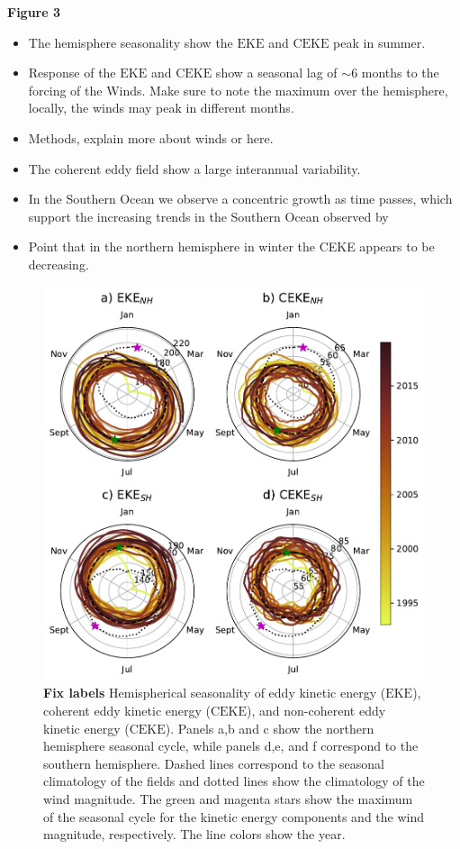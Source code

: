 \documentclass[draft,linenumbers]{agujournal2019}
\newcommand{\EKE}{\textrm{EKE}}
\newcommand{\CEKE}{\textrm{CEKE}}
\begin{document}
	\textbf{Figure 3}
	\begin{itemize}
		\item The hemisphere seasonality show the  $\EKE$ and $\CEKE$ peak in summer.
		\item Response of the $\EKE$ and $\CEKE$ show a seasonal lag of $\sim$6 months to the forcing of the Winds. Make sure to note the maximum over the hemisphere, locally, the winds may peak in different months. 
		\item Methods, explain more about winds or here. 
		\item The coherent eddy field show a large interannual variability.
		\item In the Southern Ocean we observe a concentric growth as time passes, which support the increasing trends in the Southern Ocean observed by \citep{Hogg_Recent_2015,Martinez_Kinetic_2019,Martinez_Kinetic_2021}
		\item Point that in the northern hemisphere in winter the CEKE appears to be decreasing.
	\end{itemize}

	\begin{figure}
	    \centering
	    \includegraphics[width=1\textwidth]{figures/All_polar_plots.pdf}
	    \caption{\textbf{Fix labels} Hemispherical seasonality of eddy kinetic energy ($\EKE$), coherent eddy kinetic energy ($\CEKE$), and non-coherent eddy kinetic energy ($\CEKE$). Panels a,b and c show the northern hemisphere seasonal cycle, while panels d,e, and f correspond to the southern hemisphere. Dashed lines correspond to the seasonal climatology of the fields and dotted lines show the climatology of the wind magnitude. The green and magenta stars show the maximum of the seasonal cycle for the kinetic energy components and the wind magnitude, respectively. The line colors show the year.}
	    \label{fig:eddy_energy_polar}
	\end{figure}
	
\end{document}

